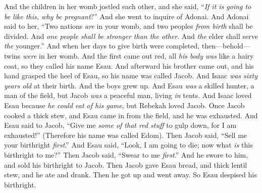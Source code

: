 \begin{biblechapter}
\verse And the children in her womb jostled each other, and she said, “\textit{If it is going to be like this, why be pregnant}?” And she went to inquire of Adonai.
\verse And Adonai said to her, “Two nations \textit{are} in your womb, and two peoples \textit{from birth} shall be divided. And \textit{one people shall be stronger than the other}. And \textit{the} elder shall serve \textit{the} younger.”
\verse And when her days to give birth were completed, then—behold—twins \textit{were} in her womb.
\verse And the first came out red, all \textit{his body} \textit{was} like a hairy coat, so they called his name Esau.
\verse And afterward his brother came out, and his hand grasped the heel of Esau, so his name was called Jacob. And Isaac \textit{was sixty years old} at their birth.
\verse And the boys grew up. And Esau \textit{was} a skilled hunter, a man of the field, but Jacob \textit{was} a peaceful man, living \textit{in} tents.
\verse And Isaac loved Esau because \textit{he could eat of his game}, but Rebekah loved Jacob.
\verse Once Jacob cooked a thick stew, and Esau came in from the field, and he was exhausted.
\verse And Esau said to Jacob, “Give me \textit{some of that red stuff} to gulp down, for I am exhausted!” (Therefore his name was called Edom).
\verse Then Jacob said, “Sell me your birthright \textit{first}.”
\verse And Esau said, “Look, I am going to die; now what \textit{is} this birthright to me?”
\verse Then Jacob said, “Swear to me \textit{first}.” And he swore to him, and sold his birthright to Jacob.
\verse Then Jacob gave Esau bread, and thick lentil stew, and he ate and drank. Then he got up and went away. So Esau despised his birthright.
\end{biblechapter}

